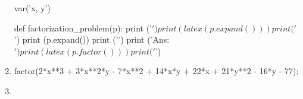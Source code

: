\begin{enumerate}[resume]

\begin{sympycode}
var('x, y')

def factorization_problem(p):
    print ('$')
    print (latex(p.expand()))
    print ('$ \n')
    print (p.expand())
    print ('\n')
    print ('Ans: $')
    print (latex(p.factor()))
    print ('$\n')

\end{sympycode}

\item {}
\begin{maximablock}
factor(2*x**3 + 3*x**2*y - 7*x**2 + 14*x*y
       + 22*x + 21*y**2 - 16*y - 77);
\end{maximablock}

\item {}

\end{enumerate}
